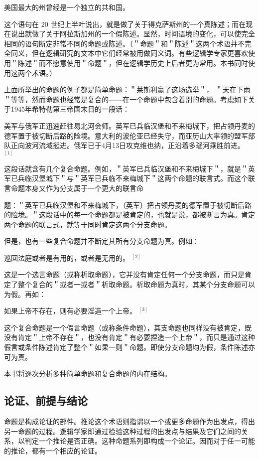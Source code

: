 美国最大的州曾经是一个独立的共和国。

这个语句在 20 世纪上半叶说出，就是做了关于得克萨斯州的一个真陈述；而在现在说出就做了关于阿拉斯加州的一个假陈述。显然，时间语境的变化，可以使完全相同的语句断定非常不同的命题或陈述。（＂命题＂和＂陈述＂这两个术语并不完全同义，但在逻辑研究的文本中它们经常被用做同义词。有些逻辑学专家更喜欢使用＂陈述＂而不愿意使用＂命题＂，但在逻辑学历史上后者更为常用。本书同时使用这两个术语。）

上面所举出的命题的例子都是简单命题：＂莱斯利赢了这场选举＂， ＂天在下雨＂等等，然而命题也经常是复合的——在一个命题中包含着别的命题。考虑如下关于1945年希特勒第三帝国末日的一段话：

美军与俄军正迅速赶往易北河会师。英军已兵临汉堡和不来梅城下，把占领丹麦的德军置于被切断后路的险境。意大利的波伦亚已经失守，而亚历山大率领的盟军部队正向波河流域挺进。俄军已于4月13日攻克维也纳，正沿着多瑙河乘胜前进。 ${ }^{[1]}$

这段话就含有几个复合命题。例如，＂英军已兵临汉堡和不来梅城下＂，就是＂英军已兵临汉堡城下＂与＂英军已兵临不来梅城下＂这两个命题的联言式。而这个联言命题本身又作为分支属于一个更大的联言命

题：＂英军已兵临汉堡和不来梅城下，（英军）把占领丹麦的德军置于被切断后路的险境。＂这段话中的每一个命题都是被肯定的，也就是说，都被断言为真。肯定两个命题的联言式，就等于同时肯定这两个分支命题。

但是，也有一些复合命题并不断定其所有分支命题为真。例如：

巡回法庭或者是有用的，或者是无用的。 ${ }^{[2]}$

这是一个选言命题（或称析取命题），它并没有肯定任何一个分支命题，而只是肯定了整个复合的＂或者一或者＂析取命题。析取命题为真时，其某个分支命题可以为假。再如：

如果上帝不存在，则有必要淫造一个上帝。 ${ }^{[3]}$

这个复合命题是一个假言命题（或称条件命题），其支命题也同样没有被肯定，既没有肯定＂上帝不存在＂，也没有肯定＂有必要捏造一个上帝＂，而只是通过这种假言或条件陈述肯定了整个＂如果一则＂命题。即使分支命题均为假，条件陈述亦可为真。

本书将逐次分析多种简单命题和复合命题的内在结构。

\subsection{论证、前提与结论}
命题是构成论证的部件。推论这个术语则指谓以一个或更多命题作为出发点，得出另一命题的过程。逻辑学家即通过检验这种过程的出发点与结果及它们之间的关系，以判定一个推论是否正确。这种命题系列即构成一个论证。因而对于任一可能的推论，都有一个相应的论证。

